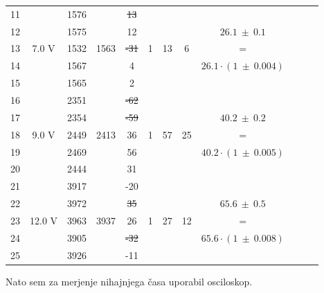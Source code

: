 \documentclass{report}
\begin{document}
{\begin{table}[H]
\begin{adjustwidth}{-3.5 cm}{0 cm}
\begin{tabular}{cccccccccccc}

\midrule
11 & \multirow{5}{*}{7.0 V} & 1576 & \multirow{5}{*}{1563} & \sout{13} & \multirow{5}{*}{1} & \multirow{5}{*}{13}  & \multirow{5}{*}{6} & \\
12 & & 1575 & & 12 & & & & $ 26.1 \ \pm \ 0.1 $\\
13 & & 1532 & & \sout{-31} & & & & =\\
14 & & 1567 & & 4 & & & & $26.1 \cdot (1 \ \pm \ 0.004)$\\
15 & & 1565 & & 2 &\\


\midrule
16 & \multirow{5}{*}{9.0 V} & 2351 & \multirow{5}{*}{2413} & \sout{-62} & \multirow{5}{*}{1} & \multirow{5}{*}{57} & \multirow{5}{*}{25} & \\
17 & & 2354 & & \sout{-59} & & & & $ 40.2 \ \pm \ 0.2 $\\
18 & & 2449 & & 36 & & & & =\\
19 & & 2469 & & 56 & & & & $40.2 \cdot (1 \ \pm \ 0.005)  $\\
20 & & 2444 & & 31 &\\


\midrule
21 & \multirow{5}{*}{12.0 V} & 3917 & \multirow{5}{*}{3937} & -20 & \multirow{5}{*}{1} & \multirow{5}{*}{27} & \multirow{5}{*}{12} & \\
22 & & 3972 & & \sout{35} & & & & $65.6 \ \pm \ 0.5$\\
23 & & 3963 & & 26 & & & & =\\
24 & & 3905 & & \sout{-32} & & & & $65.6 \cdot (1 \ \pm \ 0.008) $\\
25 & & 3926 & & -11\\
\bottomrule
\end{tabular}
\end{adjustwidth}
\end{table}
}
\pagebreak






Nato sem za merjenje nihajnjega časa uporabil osciloskop.
\end{document}
